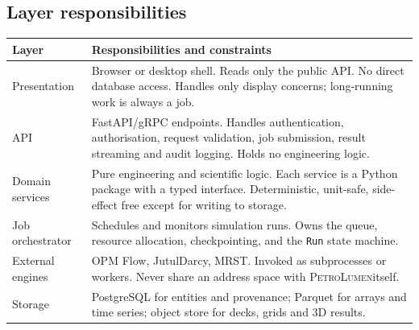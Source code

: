 \documentclass[11pt,a4paper]{article}
\newcommand{\petro}{\textsc{PetroLumen}}
\newcommand{\code}[1]{\texttt{#1}}
\begin{document}
\subsection{Layer responsibilities}

\begin{longtable}{@{}p{3.1cm}p{11.5cm}@{}}
\toprule
\textbf{Layer} & \textbf{Responsibilities and constraints}\\
\midrule
\endhead
Presentation & Browser or desktop shell. Reads only the public API. No direct
database access. Handles only display concerns; long-running work is always a
job.\\
\midrule
API & FastAPI/gRPC endpoints. Handles authentication, authorisation,
request validation, job submission, result streaming and audit logging. Holds
no engineering logic.\\
\midrule
Domain services & Pure engineering and scientific logic. Each service is a
Python package with a typed interface. Deterministic, unit-safe, side-effect
free except for writing to storage.\\
\midrule
Job orchestrator & Schedules and monitors simulation runs. Owns the queue,
resource allocation, checkpointing, and the \code{Run} state machine.\\
\midrule
External engines & OPM Flow, JutulDarcy, MRST. Invoked as subprocesses or
workers. Never share an address space with \petro itself.\\
\midrule
Storage & PostgreSQL for entities and provenance; Parquet for arrays and time
series; object store for decks, grids and 3D results.\\
\bottomrule
\end{longtable}
\end{document}
